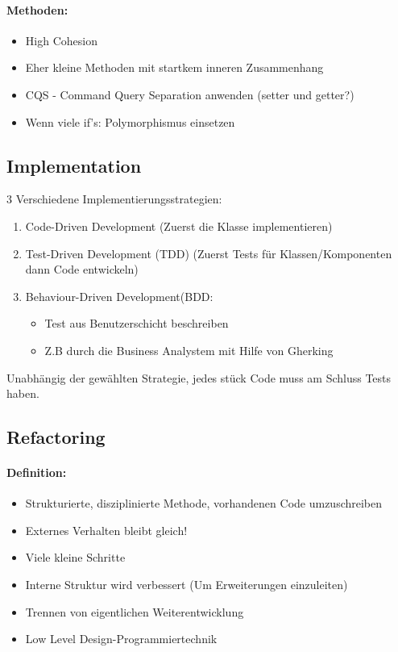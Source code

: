 \documentclass[../ZF_SWEN1.tex]{subfiles}
\begin{document}
\paragraph{Methoden:}
\begin{itemize}
	\item High Cohesion
	\item Eher kleine Methoden mit startkem inneren Zusammenhang
	\item CQS - Command Query Separation anwenden (setter und getter?)
	\item Wenn viele if's: Polymorphismus einsetzen
\end{itemize}

\subsection{Implementation}

3 Verschiedene Implementierungsstrategien:
\begin{enumerate}
	\item Code-Driven Development (Zuerst die Klasse implementieren)
	\item Test-Driven Development (TDD) (Zuerst Tests für Klassen/Komponenten dann Code entwickeln)
	\item Behaviour-Driven Development(BDD:
	\begin{itemize}
		\item Test aus Benutzerschicht beschreiben
		\item Z.B durch die Business Analystem mit Hilfe von Gherking
	\end{itemize}
\end{enumerate}

Unabhängig der gewählten Strategie, jedes stück Code muss am Schluss Tests haben.

\subsection{Refactoring}
\paragraph{Definition:}
\begin{itemize}
	\item Strukturierte, disziplinierte Methode, vorhandenen Code umzuschreiben
	\item Externes Verhalten bleibt gleich!
	\item Viele kleine Schritte
	\item Interne Struktur wird verbessert (Um Erweiterungen einzuleiten)
	\item Trennen von eigentlichen Weiterentwicklung
	\item Low Level Design-Programmiertechnik
\end{itemize}
\end{document}
